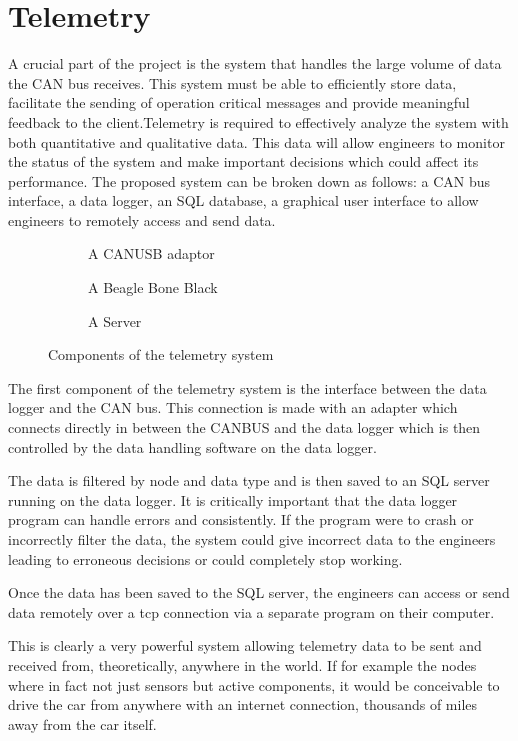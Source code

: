 \documentclass[10pt,a4paper]{article}
\begin{document}
\section{Telemetry}
A crucial part of the project is the system that handles the large volume of data the CAN bus receives. This system must be able to efficiently store data, facilitate the sending of operation critical messages and provide meaningful feedback to the client.Telemetry is required to effectively analyze the system with both quantitative and qualitative data. This data will allow engineers to monitor the status of the system and make important decisions which could affect its performance. The proposed system can be broken down as follows: a CAN bus interface, a data logger, an SQL database, a graphical user interface to allow engineers to remotely access and send data.
\begin{figure}
         \centering
         \begin{subfigure}[b]{0.6\textwidth}
                 \caption{A CANUSB adaptor}
                 \label{fig:CANUSB adaptor}
         \end{subfigure}

         \begin{subfigure}[b]{0.4\textwidth}
                 \caption{A Beagle Bone Black}
                 \label{fig:Beable Bone Black}
         \end{subfigure}

         \begin{subfigure}[b]{0.5\textwidth}
                 \caption{A Server}
                 \label{fig:Sever}
         \end{subfigure}
         \caption{Components of the telemetry system}\label{fig:telemetry}
\end{figure}
The first component of the telemetry system is the interface between the data logger and the CAN bus. This connection is made with an adapter which connects directly in between the CANBUS and the data logger which is then controlled by the data handling software on the data logger.

The data is filtered by node and data type and is then saved to an SQL server running on the data logger. It is critically important that the data logger program can handle errors and consistently. If the program were to crash or incorrectly filter the data, the system could give incorrect data to the engineers leading to erroneous decisions or could completely stop working.

Once the data has been saved to the SQL server, the engineers can access or send data remotely over a tcp connection via a separate program on their computer. 

This is clearly a very powerful system allowing telemetry data to be sent and received from, theoretically,  anywhere in the world. If for example the nodes where in fact not just sensors but active components, it would be conceivable to drive the car from anywhere with an internet connection, thousands of miles away from the car itself.
\end{document}
